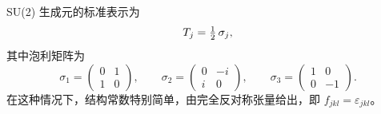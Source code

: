 SU(2) 生成元的标准表示为
\begin{equation}
  T_j = \tfrac{1}{2}\,\sigma_j,
\end{equation}
其中泡利矩阵为
\begin{equation}
  \sigma_1 = \begin{pmatrix} 0 & 1 \\ 1 & 0 \end{pmatrix},\qquad
  \sigma_2 = \begin{pmatrix} 0 & -i \\ i & 0 \end{pmatrix},\qquad
  \sigma_3 = \begin{pmatrix} 1 & 0 \\ 0 & -1 \end{pmatrix}.
\end{equation}
在这种情况下，结构常数特别简单，由完全反对称张量给出，即 $f_{jkl} = \varepsilon_{jkl}$。

